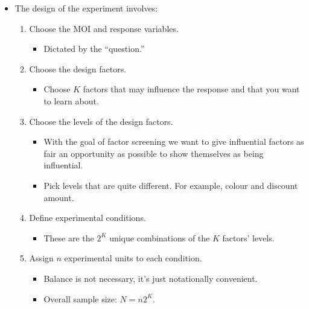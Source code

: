 \begin{itemize}[$\rightarrow$]
      \item The design of the experiment involves:
            \begin{enumerate}[1.]
                  \item Choose the MOI and response variables.
                        \begin{itemize}[$\hookrightarrow$]
                              \item Dictated by the ``question.''
                        \end{itemize}
                  \item Choose the design factors.
                        \begin{itemize}[$\hookrightarrow$]
                              \item Choose $ K $ factors that may influence the response and that you want to learn about.
                        \end{itemize}
                  \item Choose the levels of the design factors.
                        \begin{itemize}[$\hookrightarrow$]
                              \item With the goal of factor screening we want to give influential factors as fair
                                    an opportunity as possible to show themselves as being influential.
                              \item Pick levels that are quite different. For example, colour and discount amount.
                        \end{itemize}
                  \item Define experimental conditions.
                        \begin{itemize}[$\hookrightarrow$]
                              \item These are the $ 2^K $ unique combinations of the $ K $ factors' levels.
                        \end{itemize}
                  \item Assign $ n $ experimental units to each condition.
                        \begin{itemize}[$\hookrightarrow$]
                              \item Balance is not necessary, it's just notationally convenient.
                              \item Overall sample size: $ N=n2^K $.
                        \end{itemize}
            \end{enumerate}
\end{itemize}
